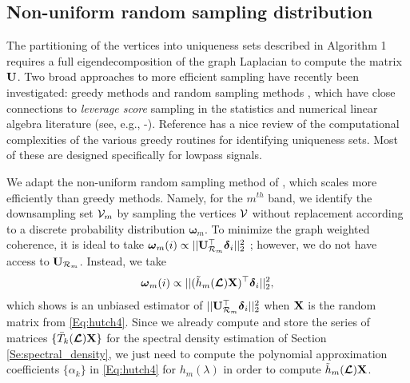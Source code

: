 \documentclass[journal, 10pt]{IEEEtran}
\begin{document}
\subsection{Non-uniform random sampling distribution}
The partitioning of the vertices into uniqueness sets described in Algorithm 1 requires a full eigendecomposition of the graph Laplacian to compute the matrix ${\bf U}$. Two broad approaches to more efficient sampling have recently been investigated: greedy methods \cite{chen2015discrete,anis2014towards,tsitsvero2016uncertainty,anis2016efficient} and random sampling methods \cite{shomorony,PuyTGV15,chen2016signal}, which have close connections to \emph{leverage score} sampling in the statistics and numerical linear algebra literature 
(see, e.g., \cite{drineas2012fast}\nocite{mahoney2009cur}-\cite{mahoney2011randomized}). 
Reference \cite{anis2016efficient} has a nice review of the computational complexities of the various greedy routines for identifying uniqueness sets. Most of these are designed specifically for lowpass signals. 
 
We adapt the non-uniform random sampling method of \cite{PuyTGV15}, which scales more efficiently than greedy methods. Namely, for the $m^{th}$ band, we identify the downsampling set ${\mathcal{V}}_m$ by sampling the vertices ${\mathcal{V}}$ without replacement according to a discrete probability distribution ${\boldsymbol \omega}_m$. To minimize the graph weighted coherence, it is ideal to take ${\boldsymbol \omega}_m(i) \propto ||{\bf U}_{{\cal R}_m}^{\top} {\boldsymbol \delta}_i ||_2^2$ \cite{PuyTGV15}; however, we do not have access to ${\bf U}_{{\cal R}_m}$. Instead, we take 
\begin{align}\label{Eq:samp_dist}
{\boldsymbol \omega}_m(i) \propto ||(\tilde{h}_m(\L){\bf X})^{\top} {\boldsymbol \delta}_i ||_2^2,
\end{align}
which \cite{PuyTGV15} shows is an unbiased estimator of $||{\bf U}_{{\cal R}_m}^{\top} {\boldsymbol \delta}_i ||_2^2$ when ${\bf X}$ is the random matrix from \eqref{Eq:hutch4}. Since we already compute and store the series of matrices $\{\bar{T}_k(\boldsymbol{\mathcal{L}}){\bf X}\}$ for the spectral density estimation of Section \ref{Se:spectral_density}, we just need to compute the polynomial approximation coefficients $\{\alpha_k\}$ in \eqref{Eq:hutch4} for $h_m(\lambda)$ in order to compute $\tilde{h}_m(\boldsymbol{\mathcal{L}}){\bf X}$.
\end{document}
